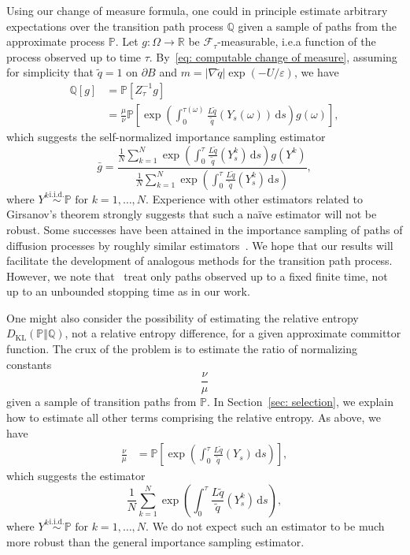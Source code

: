 \documentclass[reqno]{amsart}
\newcommand{\Real}{\mathbb{R}}
\newcommand{\eps}{\varepsilon}
\newcommand{\1}{\mathds{1}}
\renewcommand{\d}{\mathrm{d}}
\newcommand{\grad}{\nabla}
\renewcommand{\P}{\mathds{P}}
\newcommand{\Q}{\mathds{Q}}
\newcommand{\F}{\mathcal{F}}
\newcommand{\dkl}{D_{\mathrm{KL}}}
\theoremstyle{definition}
\theoremstyle{remark}
\begin{document}
Using our change of measure formula, one could in principle estimate arbitrary expectations over the transition path process $\Q$ given a sample of paths from the approximate process $\P$. Let $g : \Omega \rightarrow \Real$ be $\F_\tau$-measurable, i.e.\@ a function of the process observed up to time $\tau$. By~\eqref{eq: computable change of measure}, assuming for simplicity that $\tilde q = 1$ on $\partial B$ and $m = \lvert \grad \tilde q \rvert \exp(-U /\eps)$, we have
\begin{align*}
  \Q [ g ] &= \P \left [ Z_\tau^{-1} g  \right ] \\
           &= \frac{\mu}{\nu}  \P \left [\exp \left (\int_0^{\tau(\omega)}  \frac{L \tilde q}{\tilde q}(Y_s(\omega))\, \d s \right ) g(\omega) \right ],
\end{align*}
which suggests the self-normalized importance sampling estimator
\begin{equation*}
  \bar g = \frac{\frac{1}{N}\sum_{k = 1}^N \exp \left (\int_0^\tau  \frac{L \tilde q}{\tilde q}(Y^k_s)\, \d s \right ) g(Y^k)}{\frac{1}{N}\sum_{k = 1}^N \exp \left (\int_0^\tau  \frac{L \tilde q}{\tilde q}(Y^k_s)\, \d s \right )},
\end{equation*}
where $Y^k \overset{\mathrm{i.i.d.}}{\sim}   \P \text{ for } k = 1, \dots,  N$. Experience with other estimators related to Girsanov's theorem strongly suggests that such a na\"ive estimator will not be robust. Some successes have been attained in the importance sampling of paths of diffusion processes by roughly similar estimators~\cite{zhang_koopman_2022,dupuis_importance_2012,vanden-eijnden_rare_2012}. We hope that our results will facilitate the development of analogous methods for the transition path process. However, we note that~\cite{zhang_koopman_2022,dupuis_importance_2012,vanden-eijnden_rare_2012} treat only paths observed up to a fixed finite time, not up to an unbounded stopping time as in our work.

One might also consider the possibility of estimating the relative entropy $\dkl(\P \Vert \Q)$, not a relative entropy difference, for a given approximate committor function. The crux of the problem is to estimate the ratio of normalizing constants
\begin{equation*}
  \frac{\nu}{\mu}
\end{equation*}
given a sample of transition paths from $\P$. In Section~\ref{sec: selection}, we explain how to estimate all other terms comprising the relative entropy. As above, we have 
\begin{align*}
  \frac{\nu}{\mu} &= \P \left [\exp \left (\int_0^{\tau}  \frac{L \tilde q}{\tilde q}(Y_s)\, \d s \right )  \right ], 
\end{align*}
which suggests the estimator 
\begin{equation*}
  \frac{1}{N} \sum_{k = 1}^N \exp \left (\int_0^\tau  \frac{L \tilde q}{\tilde q}(Y^k_s)\, \d s \right ), 
\end{equation*}
where  $Y^k \overset{\mathrm{i.i.d.}}{\sim}   \P \text{ for } k = 1, \dots,  N$. We do not expect such an estimator to be much more robust than the general importance sampling estimator.  
\end{document}
